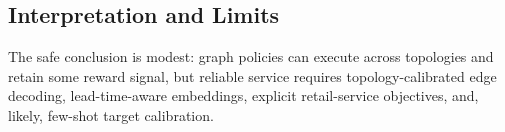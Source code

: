 \documentclass[10pt,a4paper]{article}
\providecommand{\FloatBarrier}{}
\begin{document}
\subsection{Interpretation and Limits}

The safe conclusion is modest: graph policies can execute across
topologies and retain some reward signal, but reliable service requires
topology-calibrated edge decoding, lead-time-aware embeddings, explicit
retail-service objectives, and, likely, few-shot target calibration.

\FloatBarrier
\begingroup
\small


\endgroup
\end{document}
